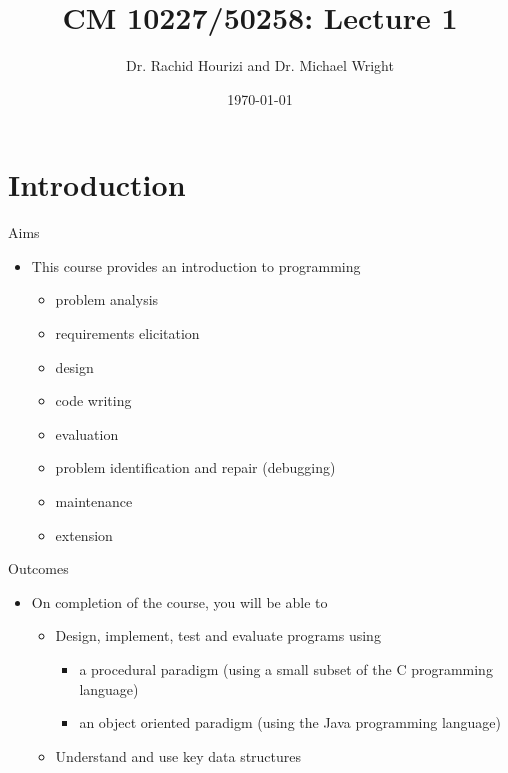 \documentclass{beamer}
\begin{document}

\title{CM 10227/50258: Lecture 1}
\author{Dr. Rachid Hourizi and Dr. Michael Wright }
\date{\today}
\frame{\titlepage}

\section{Introduction}
\begin{frame}
Aims

\begin{itemize}
\item This course provides an introduction to programming

\begin{itemize}
\item problem analysis
\item requirements elicitation
\item design
\item code writing
\item evaluation
\item problem identification and repair (debugging)
\item maintenance
\item extension
\end{itemize}
\end{itemize}
\end{frame}

\begin{frame}
Outcomes

\begin{itemize}
\item On completion of the course, you will be able to

\begin{itemize}
\item Design, implement, test and evaluate programs using

\begin{itemize}
\item a procedural paradigm (using a small subset of the C programming language)
\item an object oriented paradigm (using the Java programming language)
\end{itemize}
\item Understand and use key data structures
\end{itemize}
\end{itemize}
\end{frame} 
\end{document}
